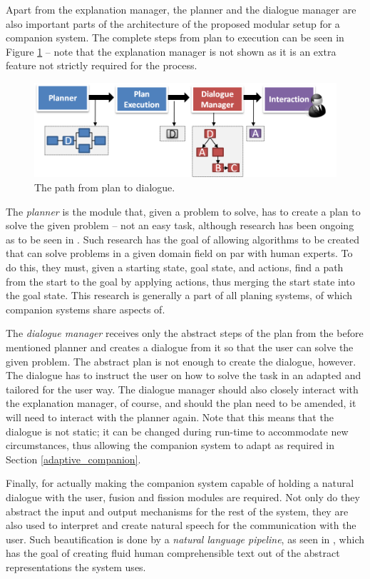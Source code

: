 \documentclass[a4paper]{article}
\begin{document}
Apart from the explanation manager, the planner and the dialogue manager are also important parts of the architecture of the proposed modular setup for a companion system. The complete steps from plan to execution can be seen in Figure \ref{fig:planner} – note that the explanation manager is not shown as it is an extra feature not strictly required for the process.

\begin{figure}[H]
	\centering
	\includegraphics[width=12cm]{planner.png}
	\caption{The path from plan to dialogue.}
	\label{fig:planner}
\end{figure}

The {\it planner} is the module that, given a problem to solve, has to create a plan to solve the given problem – not an easy task, although research has been ongoing as to be seen in \cite{seegebarth2011formale}. Such research has the goal of allowing algorithms to be created that can solve problems in a given domain field on par with human experts. To do this, they must, given a starting state, goal state, and actions, find a path from the start to the goal by applying actions, thus merging the start state into the goal state. This research is generally a part of all planing systems, of which companion systems share aspects of.

The {\it dialogue manager} receives only the abstract steps of the plan from the before mentioned planner and creates a dialogue from it so that the user can solve the given problem. The abstract plan is not enough to create the dialogue, however. The dialogue has to instruct the user on how to solve the task in an adapted and tailored for the user way. The dialogue manager should also closely interact with the explanation manager, of course, and should the plan need to be amended, it will need to interact with the planner again. Note that this means that the dialogue is not static; it can be changed during run-time to accommodate new circumstances, thus allowing the companion system to adapt as required in Section \ref{adaptive_companion}.

Finally, for actually making the companion system capable of holding a natural dialogue with the user, fusion and fission modules are required. Not only do they abstract the input and output mechanisms for the rest of the system, they are also used to interpret and create natural speech for the communication with the user. Such beautification is done by a {\it natural language pipeline}, as seen in \cite{reiter2000building}, which has the goal of creating fluid human comprehensible text out of the abstract representations the system uses.
\end{document}
